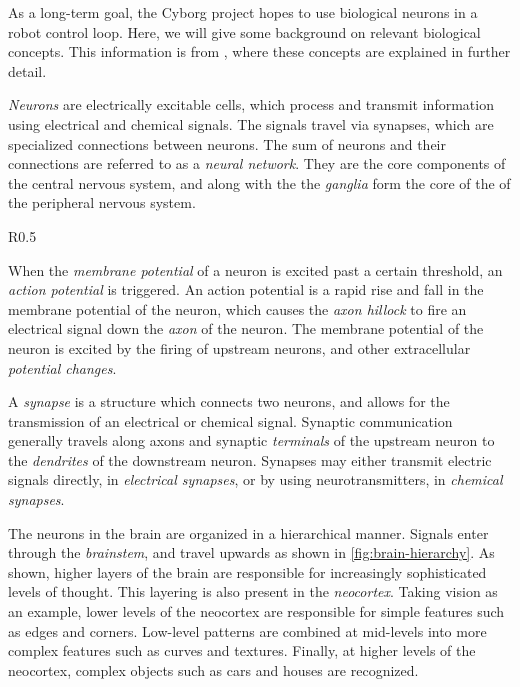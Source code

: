 \documentclass[\rootfolder/main.tex]{subfiles}
\begin{document}
As a long-term goal, the Cyborg project hopes to use biological neurons in a robot control loop.
Here, we will give some background on relevant biological concepts.
This information is from \cite{Knudsen2016}, where these concepts are explained in further detail.

\emph{Neurons} are electrically excitable cells, which process and transmit information using electrical and chemical signals.
The signals travel via synapses, which are specialized connections between neurons.
The sum of neurons and their connections are referred to as a \emph{neural network}.
They are the core components of the central nervous system, and along with the the \emph{ganglia} form the core of the of the peripheral nervous system.

\begin{wrapfigure}{R}{0.5\columnwidth}
    \caption[Model of the hierarchical structure of the brain.]{Model of the hierarchical structure of the brain\cite{Perry1999}.\label{fig:brain-hierarchy}}
\end{wrapfigure}

When the \emph{membrane potential} of a neuron is excited past a certain threshold, an \emph{action potential} is triggered.
An action potential is a rapid rise and fall in the membrane potential of the neuron, which causes the \emph{axon hillock} to fire an electrical signal down the \emph{axon} of the neuron.
The membrane potential of the neuron is excited by the firing of upstream neurons, and other extracellular \emph{potential changes}.

A \emph{synapse} is a structure which connects two neurons, and allows for the transmission of an electrical or chemical signal.
Synaptic communication generally travels along axons and synaptic \emph{terminals} of the upstream neuron to the \emph{dendrites} of the downstream neuron.
Synapses may either transmit electric signals directly, in \emph{electrical synapses}, or by using neurotransmitters, in \emph{chemical synapses}.

The neurons in the brain are organized in a hierarchical manner.
Signals enter through the \emph{brainstem}, and travel upwards as shown in \cref{fig:brain-hierarchy}.
As shown, higher layers of the brain are responsible for increasingly sophisticated levels of thought.
This layering is also present in the \emph{neocortex}.
Taking vision as an example, lower levels of the neocortex are responsible for simple features such as edges and corners.
Low-level patterns are combined at mid-levels into more complex features such as curves and textures.
Finally, at higher levels of the neocortex, complex objects such as cars and houses are recognized.
\end{document}
